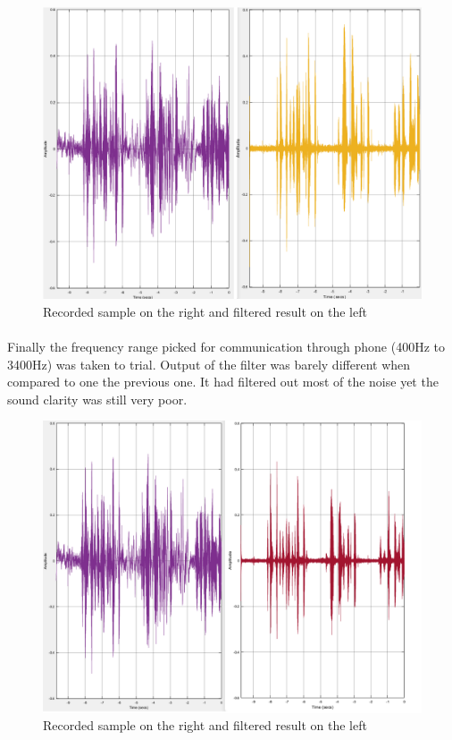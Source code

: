 \begin{figure}
  \centering
    \includegraphics[width=0.7\paperwidth]{Illustrations/100HZto3KHzfilter}
    \caption{Recorded sample on the right and filtered result on the left}
\end{figure}

\paragraph{} Finally the frequency range picked for communication through phone (400Hz to 3400Hz) was taken to trial. Output of the filter was barely different when compared to one the previous one. It had filtered out most of the noise yet the sound clarity was still very poor.

\begin{figure}[htp]
  \centering
    \includegraphics[width=0.7\paperwidth]{Illustrations/400HZto3400Hzfilter}
    \caption{Recorded sample on the right and filtered result on the left}
\end{figure}

